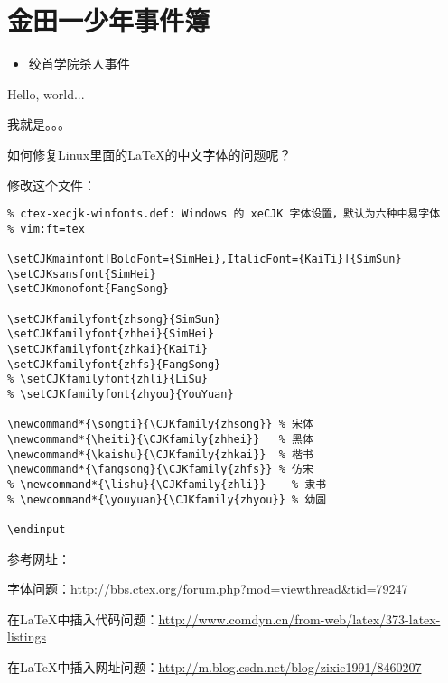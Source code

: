 \documentclass{ctexart}
\begin{document}
\section{金田一少年事件簿}
\begin{itemize}
  \item 绞首学院杀人事件
\end{itemize}


Hello, world...

我就是。。。

\newpage

如何修复Linux里面的\LaTeX{}的中文字体的问题呢？

修改这个文件：

\begin{lstlisting}
% ctex-xecjk-winfonts.def: Windows 的 xeCJK 字体设置，默认为六种中易字体
% vim:ft=tex

\setCJKmainfont[BoldFont={SimHei},ItalicFont={KaiTi}]{SimSun}
\setCJKsansfont{SimHei}
\setCJKmonofont{FangSong}

\setCJKfamilyfont{zhsong}{SimSun}
\setCJKfamilyfont{zhhei}{SimHei}
\setCJKfamilyfont{zhkai}{KaiTi}
\setCJKfamilyfont{zhfs}{FangSong}
% \setCJKfamilyfont{zhli}{LiSu}
% \setCJKfamilyfont{zhyou}{YouYuan}

\newcommand*{\songti}{\CJKfamily{zhsong}} % 宋体
\newcommand*{\heiti}{\CJKfamily{zhhei}}   % 黑体
\newcommand*{\kaishu}{\CJKfamily{zhkai}}  % 楷书
\newcommand*{\fangsong}{\CJKfamily{zhfs}} % 仿宋
% \newcommand*{\lishu}{\CJKfamily{zhli}}    % 隶书
% \newcommand*{\youyuan}{\CJKfamily{zhyou}} % 幼圆

\endinput

\end{lstlisting}

参考网址：

字体问题：\url{http://bbs.ctex.org/forum.php?mod=viewthread&tid=79247}

在\LaTeX{}中插入代码问题：\url{http://www.comdyn.cn/from-web/latex/373-latex-listings}

在\LaTeX{}中插入网址问题：\url{http://m.blog.csdn.net/blog/zixie1991/8460207}
\end{document}
